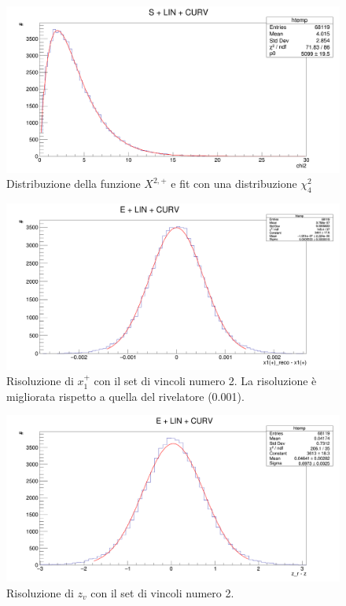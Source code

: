 \documentclass[8pt]{extarticle}
\begin{document}
\begin{figure}
	\begin{center}
		\includegraphics[scale=0.25]{set_1_chi2} 
		\caption{Distribuzione della funzione $X^{2,+}$ e fit con una distribuzione $\chi^2_4$}
		\label{fig:set_1_chi2}
	\end{center}
\end{figure}

\begin{figure}
	\begin{center}
		\includegraphics[scale=0.25]{set_2_x} 
		\caption{Risoluzione di $x_1^+$ con il set di vincoli numero 2. La risoluzione è migliorata rispetto a quella del rivelatore (0.001).}
		\label{fig:set_2_x}
	\end{center}
\end{figure}

\begin{figure}
	\begin{center}
		\includegraphics[scale=0.25]{set_2_z} 
		\caption{Risoluzione di $z_v$ con il set di vincoli numero 2.}
		\label{fig:set_2_z}
	\end{center}
\end{figure}
\end{document}
